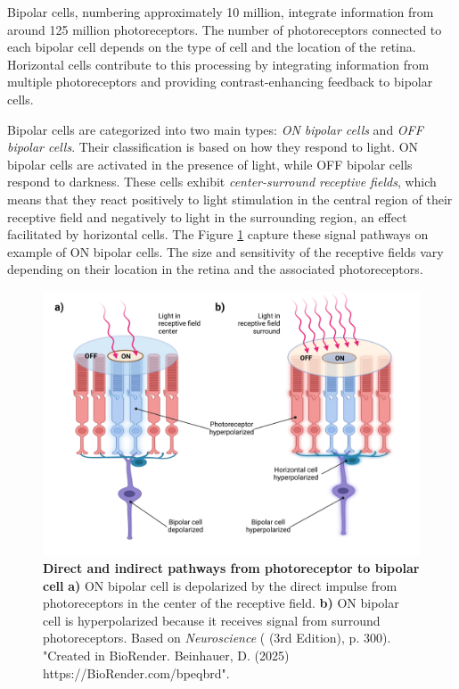 Bipolar cells, numbering approximately 10 million, integrate information from around
125 million photoreceptors. The number of photoreceptors connected to each bipolar
cell depends on the type of cell and the location of the retina. Horizontal cells contribute 
to this processing by integrating information from multiple photoreceptors and
providing contrast-enhancing feedback to bipolar cells.

Bipolar cells are categorized into two main types: \emph{ON bipolar cells} 
and \emph{OFF bipolar cells}. Their classification is based on how they 
respond to light. ON bipolar cells are activated in the presence of light, 
while OFF bipolar cells respond to darkness. These cells exhibit
\emph{center-surround receptive fields}, which means that they react positively to light
stimulation in the central region of their receptive field and negatively to
light in the surrounding region, an effect facilitated by horizontal cells. The Figure \ref{fig:on_off_cells} capture these signal pathways on example of ON bipolar cells.
The size and sensitivity of the receptive fields vary depending on their location in the retina and the associated photoreceptors.

\begin{figure}
    \centering
    \includegraphics[width=\linewidth]{img/on_off_cells.pdf}
    \caption{\textbf{Direct and indirect pathways from photoreceptor to bipolar cell} \textbf{a)} ON bipolar cell is depolarized by the direct impulse from photoreceptors in the center of the receptive field. \textbf{b)} ON bipolar cell is hyperpolarized because it receives signal from surround photoreceptors. Based on \emph{Neuroscience} (\citet{bear2020neuroscience} (3rd Edition), p. 300). "Created in BioRender. Beinhauer, D. (2025) https://BioRender.com/bpeqbrd".}
    \label{fig:on_off_cells}
\end{figure}

